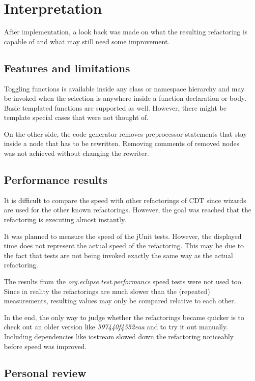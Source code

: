 \chapter{Interpretation}
\thispagestyle{fancy}

After implementation, a look back was made on what the resulting refactoring is 
capable of and what may still need some improvement.

\section{Features and limitations}

Toggling functions is available inside any class or namespace hierarchy and may 
be invoked when the selection is anywhere inside a function declaration or body. 
Basic templated functions are supported as well. However, there might be 
template special cases that were not thought of.

On the other side, the code generator removes preprocessor statements that stay 
inside a node that has to be rewritten. Removing comments of removed nodes was 
not achieved without changing the rewriter.

\section{Performance results}

It is difficult to compare the speed with other refactorings of CDT since wizards 
are used for the other known refactorings. However, the goal was reached that 
the refactoring is executing almost instantly.

It was planned to measure the speed of the jUnit tests. However, the displayed 
time does not represent the actual speed of the refactoring. This may be due to 
the fact that tests are not being invoked exactly the same way as the actual 
refactoring. 

The results from the \textit{org.eclipse.test.performance} speed tests were not 
used too. Since in reality the refactorings are much slower than the 
(repeated) measurements, resulting values may only be compared relative to each 
other.

In the end, the only way to judge whether the refactorings became quicker is to 
check out an older version like \textit{597440f4552eaa} and to try it out 
manually. Including dependencies like iostream slowed down the refactoring 
noticeably before speed was improved.

\section{Personal review}

